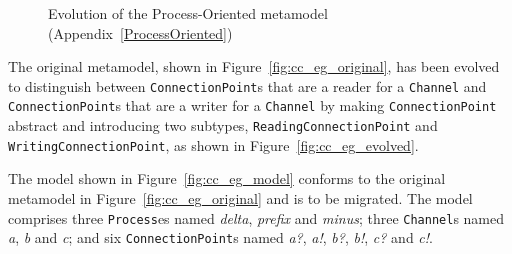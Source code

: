 \begin{figure}[htb]
	\centering
	\caption[Evolution of the Process-Oriented metamodel]{Evolution of the Process-Oriented metamodel (Appendix~\ref{ProcessOriented})}
\label{fig:cc_eg_mms}
\end{figure}

The original metamodel, shown in Figure~\ref{fig:cc_eg_original}, has been evolved to distinguish between \texttt{Co\-nn\-ec\-ti\-o\-nP\-oi\-nt}s that are a reader for a \texttt{Ch\-an\-n\-el} and \texttt{Co\-nn\-ec\-ti\-o\-nP\-oi\-nt}s that are a writer for a \texttt{Ch\-an\-n\-el} by making \texttt{Co\-nn\-ec\-ti\-o\-nP\-oi\-nt} abstract and introducing two subtypes, \texttt{Re\-a\-di\-ngCo\-nn\-ec\-ti\-o\-nP\-oi\-nt} and \texttt{Wr\-i\-ti\-ngCo\-nn\-ec\-ti\-o\-nP\-oi\-nt}, as shown in Figure~\ref{fig:cc_eg_evolved}.

The model shown in Figure~\ref{fig:cc_eg_model} conforms to the original metamodel in Figure~\ref{fig:cc_eg_original} and is to be migrated. The model comprises three \texttt{Pr\-oc\-e\-ss}es named \emph{delta}, \emph{prefix} and \emph{minus}; three \texttt{Ch\-an\-n\-el}s named \emph{a}, \emph{b} and \emph{c}; and six \texttt{Co\-nn\-ec\-ti\-o\-nP\-oi\-nt}s named \emph{a?}, \emph{a!}, \emph{b?}, \emph{b!}, \emph{c?} and \emph{c!}.

